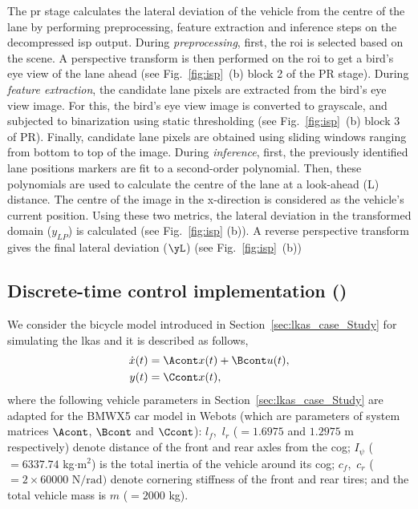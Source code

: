 \par The \acrfull{pr} stage calculates the lateral deviation of the vehicle from the centre of the lane by performing preprocessing, feature extraction and inference steps on the decompressed \gls{isp} output.
During \textit{preprocessing}, first, the \gls{roi} is selected based on the scene. A perspective transform is then performed on the \gls{roi} to get a bird's eye view of the lane ahead (see Fig.\ \ref{fig:isp}~(b) block 2 of the PR stage). During \textit{feature extraction},  the candidate lane pixels are extracted from the bird's eye view image. For this, the bird's eye view image is converted to grayscale, and subjected to binarization using static thresholding (see Fig.\ \ref{fig:isp}~(b) block 3 of PR). Finally, candidate lane pixels are obtained using sliding windows ranging from bottom to top of the image. During \textit{inference}, 
first, the previously identified lane positions markers are fit to a second-order polynomial. Then, these polynomials are used to calculate the centre of the lane at a look-ahead (L) distance. The centre of the image in the x-direction is considered as the vehicle's current position. Using these two metrics, the lateral deviation in the transformed domain ($y_{LP}$) is calculated (see Fig.\ \ref{fig:isp} (b)). A reverse perspective transform gives the final lateral deviation ($\yL$) (see Fig.\ \ref{fig:isp}~(b))

\noindent
\subsection{Discrete-time control implementation (\taskC)}
\label{sec:ch6_lqr}
We consider the bicycle model introduced in Section~\ref{sec:lkas_case_Study} for simulating the \gls{lkas} and it is described as follows,
\begin{align}
     \dot x(t) &= \Acont x(t) + \Bcont u(t), \nonumber
     \\
     y(t) &= \Ccont x(t), \nonumber
\end{align}
where the following vehicle parameters in Section~\ref{sec:lkas_case_Study} are adapted for the BMWX5 car model in Webots (which are parameters of system matrices $\Acont$, $\Bcont$ and $\Ccont$):
$l_{f}$,\ $l_{r}$ ($=1.6975$ and $1.2975$ m respectively) denote distance of the front and rear axles from the \gls{cog};
$I_{\psi}$ ($=6337.74$ kg$\cdot$m$^2$) is the total inertia of the vehicle around its \gls{cog};
$c_{f}$,\ $c_{r}$ (${=2\times60000\text{~N/rad)}}$ denote cornering stiffness of the front and rear tires; and the total vehicle mass is $m$ ($=2000$ kg).

